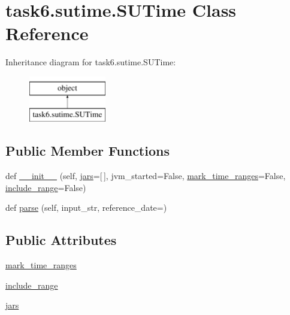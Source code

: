 \hypertarget{classtask6_1_1sutime_1_1SUTime}{}\section{task6.\+sutime.\+S\+U\+Time Class Reference}
\label{classtask6_1_1sutime_1_1SUTime}
Inheritance diagram for task6.\+sutime.\+S\+U\+Time\+:\begin{figure}[H]
\begin{center}
\leavevmode
\includegraphics[height=2.000000cm]{classtask6_1_1sutime_1_1SUTime}
\end{center}
\end{figure}
\subsection*{Public Member Functions}
\begin{DoxyCompactItemize}
\item 
def \hyperlink{classtask6_1_1sutime_1_1SUTime_ad3d2f079441d91580b76c08e8cbbc01c}{\+\_\+\+\_\+init\+\_\+\+\_\+} (self, \hyperlink{classtask6_1_1sutime_1_1SUTime_aee86d05dd182246589b8f0eb6ea16897}{jars}=\mbox{[}$\,$\mbox{]}, jvm\+\_\+started=False, \hyperlink{classtask6_1_1sutime_1_1SUTime_a406b3a84a46ccab63a3b514e475d998e}{mark\+\_\+time\+\_\+ranges}=False, \hyperlink{classtask6_1_1sutime_1_1SUTime_a7e81771e26b1f92df6118f131798a034}{include\+\_\+range}=False)
\item 
def \hyperlink{classtask6_1_1sutime_1_1SUTime_a171448f34de8cab7d19e1353c8495c65}{parse} (self, input\+\_\+str, reference\+\_\+date=\textquotesingle{}\textquotesingle{})
\end{DoxyCompactItemize}
\subsection*{Public Attributes}
\begin{DoxyCompactItemize}
\item 
\hyperlink{classtask6_1_1sutime_1_1SUTime_a406b3a84a46ccab63a3b514e475d998e}{mark\+\_\+time\+\_\+ranges}
\item 
\hyperlink{classtask6_1_1sutime_1_1SUTime_a7e81771e26b1f92df6118f131798a034}{include\+\_\+range}
\item 
\hyperlink{classtask6_1_1sutime_1_1SUTime_aee86d05dd182246589b8f0eb6ea16897}{jars}
\end{DoxyCompactItemize}



